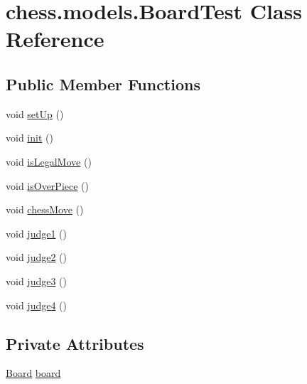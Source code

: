 \hypertarget{classchess_1_1models_1_1_board_test}{}\section{chess.\+models.\+Board\+Test Class Reference}
\label{classchess_1_1models_1_1_board_test}
\subsection*{Public Member Functions}
\begin{DoxyCompactItemize}
\item 
void \mbox{\hyperlink{classchess_1_1models_1_1_board_test_ada0da65b84521c5c95d305119b39b969}{set\+Up}} ()
\item 
void \mbox{\hyperlink{classchess_1_1models_1_1_board_test_a10af4ad3bb2f8e37a64dcce7a8b7dfc2}{init}} ()
\item 
void \mbox{\hyperlink{classchess_1_1models_1_1_board_test_aa036eb171b9c74201487bc2a28b4b144}{is\+Legal\+Move}} ()
\item 
void \mbox{\hyperlink{classchess_1_1models_1_1_board_test_a1773084965e42a6c3b2e6ff3f44d72e9}{is\+Over\+Piece}} ()
\item 
void \mbox{\hyperlink{classchess_1_1models_1_1_board_test_a3d0c25a13f7bffb5fcdc2baa95140282}{chess\+Move}} ()
\item 
void \mbox{\hyperlink{classchess_1_1models_1_1_board_test_ac9b34935f4cdf3524798e4c178036fbd}{judge1}} ()
\item 
void \mbox{\hyperlink{classchess_1_1models_1_1_board_test_a708f6fe814a3302d04a1cce4b8240888}{judge2}} ()
\item 
void \mbox{\hyperlink{classchess_1_1models_1_1_board_test_a6f1053d76b490513d3c7584152633f95}{judge3}} ()
\item 
void \mbox{\hyperlink{classchess_1_1models_1_1_board_test_a4074e4e4aa38a30e48d4751f78b9e7ea}{judge4}} ()
\end{DoxyCompactItemize}
\subsection*{Private Attributes}
\begin{DoxyCompactItemize}
\item 
\mbox{\hyperlink{classchess_1_1models_1_1_board}{Board}} \mbox{\hyperlink{classchess_1_1models_1_1_board_test_ae446364096370bd47e97f66f40864599}{board}}
\end{DoxyCompactItemize}


